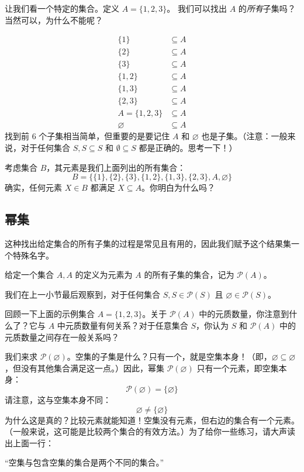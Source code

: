 让我们看一个特定的集合。定义 $A = \{1, 2, 3\}$。 我们可以找出 $A$ 的\textit{所有}子集吗？当然可以，为什么不能呢？

\begin{align*}
    \{1\} &\subseteq A \\
    \{2\} &\subseteq A \\
    \{3\} &\subseteq A \\
    \{1,2\} &\subseteq A \\
    \{1,3\} &\subseteq A \\
    \{2,3\} &\subseteq A \\
    A = \{1, 2,3\} &\subseteq A \\
    \varnothing &\subseteq A
\end{align*}
找到前 6 个子集相当简单，但重要的是要记住 $A$ 和 $\varnothing$ 也是子集。（注意：一般来说，对于任何集合 $S, S \subseteq S$ 和 $∅ \subseteq S$ 都是正确的。思考一下！）

考虑集合 $B$，其元素是我们上面列出的所有集合：
\[B = \{\{1\}, \{2\}, \{3\}, \{1, 2\}, \{1, 3\}, \{2, 3\}, A, \varnothing\}\]
确实，任何元素 $X \in B$ 都满足 $X \subseteq A$。你明白为什么吗？

\subsection{幂集}

这种找出给定集合的所有子集的过程是常见且有用的，因此我们赋予这个结果集一个特殊名字。

\begin{definition}
    给定一个集合 $A, A$ 的定义为元素为 $A$ 的所有子集的集合，记为 $\mathcal{P}(A)$。
\end{definition}

我们在上一小节最后观察到，对于任何集合 $S, S \in \mathcal{P}(S)$ 且 $\varnothing \in \mathcal{P}(S)$。

回顾一下上面的示例集合 $A = \{1, 2, 3\}$。关于 $\mathcal{P}(A)$ 中的元质数量，你注意到什么了？它与 $A$ 中元质数量有何关系？对于任意集合 $S$，你认为 $S$ 和 $\mathcal{P}(A)$ 中的元质数量之间存在一般关系吗？

\begin{example}
    我们来求 $\mathcal{P}(\varnothing)$。空集的子集是什么？只有一个，就是空集本身！（即，$\varnothing \subseteq \varnothing$，但没有其他集合满足这一点。）因此，幂集 $\mathcal{P}(\varnothing)$ 只有一个元素，即空集本身：
    \[\mathcal{P}(\varnothing) = \{ \varnothing \}\]
    请注意，这与空集本身不同：
    \[\varnothing \ne \{ \varnothing \}\]
    为什么这是真的？比较元素就能知道！空集没有元素，但右边的集合有一个元素。（一般来说，这可能是比较两个集合的有效方法。）为了给你一些练习，请大声读出上面一行：
    \begin{center}
        ``空集与包含空集的集合是两个不同的集合。''
    \end{center}
\end{example}

